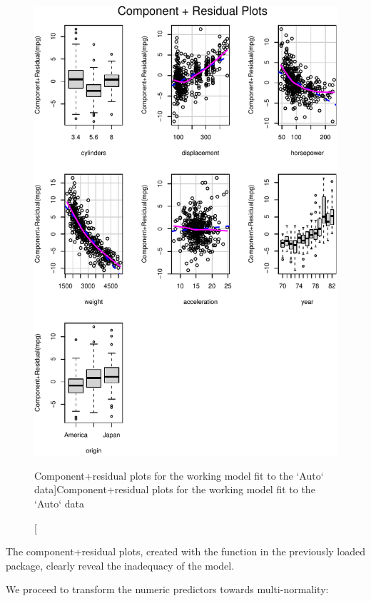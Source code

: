 \documentclass[
]{jss}
\begin{document}
\begin{CodeChunk}
\begin{figure}
{\centering \includegraphics[width=1\linewidth]{JSS-article_files/figure-latex/Auto-working-model-1} 

}

\caption[Component+residual plots for the working model fit to the `Auto` data]{Component+residual plots for the working model fit to the `Auto` data}\label{fig:Auto-working-model}
\end{figure}
\end{CodeChunk}

The component+residual plots, created with the  function
in the previously loaded  package, clearly reveal the
inadequacy of the model.

We proceed to transform the numeric predictors towards multi-normality:
\end{document}
